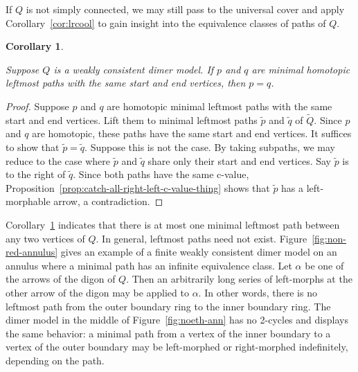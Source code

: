 \documentclass{article}
\newtheorem{cor}[thm]{Corollary}
\theoremstyle{definition}
\begin{document}
If $Q$ is not simply connected, we may still pass to the universal cover and apply Corollary~\ref{cor:lrcool} to gain insight into the equivalence classes of paths of $Q$.

\begin{cor}\label{cor:thin-leftmost-path-unique}
    
	Suppose $Q$ is a weakly consistent dimer model. If $p$ and $q$ are minimal homotopic leftmost paths with the same start and end vertices, then $p=q$.
\end{cor}
\begin{proof}
	Suppose $p$ and $q$ are homotopic minimal leftmost paths with the same start and end vertices. Lift them to minimal leftmost paths $\tilde p$ and $\tilde q$ of $\widetilde Q$. Since $p$ and $q$ are homotopic, these paths have the same start and end vertices. It suffices to show that $\tilde p=\tilde q$. Suppose this is not the case. By taking subpaths, we may reduce to the case where $\tilde p$ and $\tilde q$ share only their start and end vertices. Say $\tilde p$ is to the right of $\tilde q$. Since both paths have the same c-value, Proposition~\ref{prop:catch-all-right-left-c-value-thing} shows that $\tilde p$ has a left-morphable arrow, a contradiction.
\end{proof}

Corollary~\ref{cor:thin-leftmost-path-unique} indicates that there is at most one minimal leftmost path between any two vertices of $Q$.
In general, leftmost paths need not exist. Figure~\ref{fig:non-red-annulus} gives an example of a finite weakly consistent dimer model on an annulus where a minimal path has an infinite equivalence class. Let $\alpha$ be one of the arrows of the digon of $Q$. Then an arbitrarily long series of left-morphs at the other arrow of the digon may be applied to $\alpha$. In other words, there is no leftmost path from the outer boundary ring to the inner boundary ring.
The dimer model in the middle of Figure~\ref{fig:noeth-ann} has no 2-cycles and displays the same behavior: a minimal path from a vertex of the inner boundary to a vertex of the outer boundary may be left-morphed or right-morphed indefinitely, depending on the path.
\end{document}
